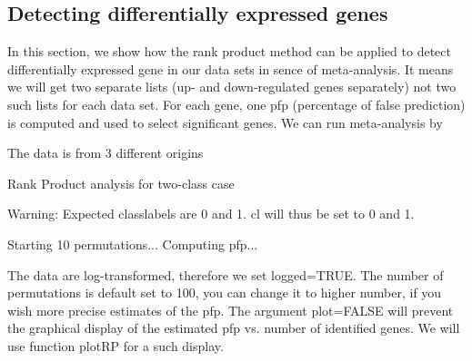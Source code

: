 \documentclass[a4paper]{report}
\begin{document}
\subsection*{Detecting differentially expressed genes}
In this section, we show how the rank product method can be applied to detect differentially expressed gene in our data sets in sence of meta-analysis. It means we will get two separate lists (up- and down-regulated genes separately) not two such lists for each data set. For each gene, one pfp (percentage of false prediction) is computed and used to select significant genes.
We can run meta-analysis by
\begin{Schunk}
\begin{Soutput}
 The data is from  3 different origins 
 
Rank Product analysis for two-class case 
 
Warning: Expected classlabels are 0 and 1. cl will thus be set to 0 and 1. 
 
Starting  10 permutations... 
Computing pfp... 
\end{Soutput}
\end{Schunk}
The data are log-transformed, therefore we set {\ttfamily logged=TRUE}. The number of permutations is default set to 100, you can change it to higher number, if you wish more precise estimates of the pfp. The argument {\ttfamily plot=FALSE} will prevent the graphical display of the estimated pfp vs. number of identified genes. We will use function {\ttfamily plotRP} for a such display.
\end{document}
